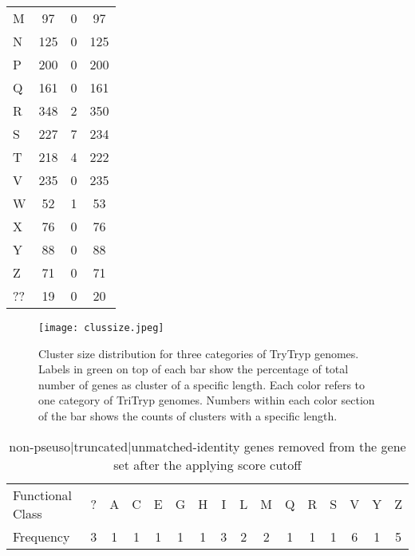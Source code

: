 \documentclass[table,
12pt, %
a4paper, %
oneside, %
headinclude,footinclude, %
BCOR5mm, %
]{scrartcl}
\begin{document}
\begin{table}[htbp]
\begin{adjustbox}{center}
\begin{tabular}{|lccc|}
      M           & 97           & 0       & 97     \\
      N           & 125          & 0       & 125    \\
      P           & 200          & 0       & 200    \\
      Q           & 161          & 0       & 161    \\
      R           & 348          & 2       & 350    \\
      S           & 227          & 7       & 234    \\
      T           & 218          & 4       & 222    \\
      V           & 235          & 0       & 235    \\
      W           & 52           & 1       & 53     \\
      X           & 76           & 0       & 76     \\
      Y           & 88           & 0       & 88     \\
      Z           & 71           & 0       & 71     \\
      ??          & 19           & 0       & 20     \\
      \hline
    \end{tabular}
    \label{table:genesummery}
  \end{adjustbox}
\end{table}



\begin{figure}[tb]
  \centering
  \texttt{[image: clussize.jpeg]}
  \caption[Genome Comparison]{Cluster size distribution for three categories of TryTryp genomes. Labels in green on top of each bar show the percentage of total number of genes as cluster of a specific length. Each color refers to one category of TriTryp genomes. Numbers within each color section of the bar shows the counts of clusters with a specific length.} 
  \label{fig:clussize}
\end{figure} 	

\begin{table}[htbp]
  \caption{non-pseuso|truncated|unmatched-identity genes removed from the gene set after the applying score cutoff}
  \begin{adjustbox}{width=10cm,center}
    \begin{tabular}{|l|ccccccccccccccc|}
      \hline
      Functional Class & ? & A & C & E & G & H & I & L & M & Q & R & S & V & Y & Z \\
      Frequency        & 3 & 1 & 1 & 1 & 1 & 1 & 3 & 2 & 2 & 1 & 1 & 1 & 6 & 1 & 5 \\
      \hline
    \end{tabular}
    \label{table:removedgenes}
  \end{adjustbox}
\end{table}
\end{document}
